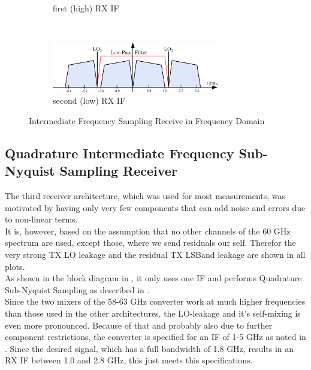 \begin{figure}[h!]
\begin{subfigure}{\textwidth}
    \caption{first (high) \gls{RX} \gls{IF}}
    \label{fig:rx_1_freq_rx_if1}
  \end{subfigure}
  \vspace{4ex} \\
  \begin{subfigure}{\textwidth}
    \centering
    \includegraphics[width=0.8\textwidth]{figures/rx_1_freq_rx_if2}
    \caption{second (low) \gls{RX} \gls{IF}}
    \label{fig:rx_1_freq_rx_if2}
  \end{subfigure}
  \caption{Intermediate Frequency Sampling Receive in Frequency Domain}
  \label{fig:rx_1_freq}
\end{figure}

\subsection{Quadrature Intermediate Frequency Sub-Nyquist Sampling Receiver}
\label{sec:rx_2}
The third receiver architecture, which was used for most measurements,
was motivated by having only very few components that can add noise
and errors due to non-linear terms. \\

It is, however, based on the assumption that no other channels of the
60 GHz spectrum are used, except those, where we send residuals our self.
Therefor the very strong \gls{TX} \gls{LO} leakage and
the residual \gls{TX} \gls{LSBand} leakage are shown in all plots. \\

As shown in the block diagram in , it only uses one
\gls{IF} and performs Quadrature Sub-Nyquist Sampling as described
in . \\

Since the two mixers of the 58-63 GHz converter work at much
higher frequencies than those used in the other architectures, the
\gls{LO}-leakage and it's self-mixing is even more pronounced.
Because of that and probably also due to further component restrictions,
the converter is specified for an \gls{IF} of 1-5 GHz as noted in
.
Since the desired signal, which has a full bandwidth of 1.8 GHz,
results in an \gls{RX} \gls{IF} between 1.0 and 2.8 GHz, this just meets
this specifications. \\

